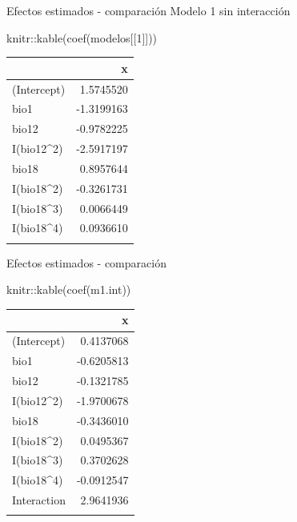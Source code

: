 \documentclass[
  11pt,
  ignorenonframetext,
]{beamer}
\newenvironment{Shaded}{}{}
\newcommand{\DecValTok}[1]{\textcolor[rgb]{0.25,0.63,0.44}{#1}}
\newcommand{\FunctionTok}[1]{\textcolor[rgb]{0.02,0.16,0.49}{#1}}
\newcommand{\NormalTok}[1]{#1}
\newcommand{\SpecialCharTok}[1]{\textcolor[rgb]{0.25,0.44,0.63}{#1}}
\begin{document}
\begin{frame}[fragile]{Efectos estimados - comparación}
\protect\hypertarget{efectos-estimados---comparaciuxf3n}{}
Modelo 1 sin interacción

\begin{Shaded}
\begin{Highlighting}[]
\NormalTok{knitr}\SpecialCharTok{::}\FunctionTok{kable}\NormalTok{(}\FunctionTok{coef}\NormalTok{(modelos[[}\DecValTok{1}\NormalTok{]]))}
\end{Highlighting}
\end{Shaded}

\begin{longtable}[]{@{}lr@{}}
\toprule\noalign{}
& x \\
\midrule\noalign{}
\endhead
(Intercept) & 1.5745520 \\
bio1 & -1.3199163 \\
bio12 & -0.9782225 \\
I(bio12\^{}2) & -2.5917197 \\
bio18 & 0.8957644 \\
I(bio18\^{}2) & -0.3261731 \\
I(bio18\^{}3) & 0.0066449 \\
I(bio18\^{}4) & 0.0936610 \\
\bottomrule\noalign{}
\end{longtable}
\end{frame}

\begin{frame}[fragile]{Efectos estimados - comparación}
\protect\hypertarget{efectos-estimados---comparaciuxf3n-1}{}
\begin{Shaded}
\begin{Highlighting}[]
\NormalTok{knitr}\SpecialCharTok{::}\FunctionTok{kable}\NormalTok{(}\FunctionTok{coef}\NormalTok{(m1.int))}
\end{Highlighting}
\end{Shaded}

\begin{longtable}[]{@{}lr@{}}
\toprule\noalign{}
& x \\
\midrule\noalign{}
\endhead
(Intercept) & 0.4137068 \\
bio1 & -0.6205813 \\
bio12 & -0.1321785 \\
I(bio12\^{}2) & -1.9700678 \\
bio18 & -0.3436010 \\
I(bio18\^{}2) & 0.0495367 \\
I(bio18\^{}3) & 0.3702628 \\
I(bio18\^{}4) & -0.0912547 \\
Interaction & 2.9641936 \\
\bottomrule\noalign{}
\end{longtable}
\end{frame}
\end{document}
